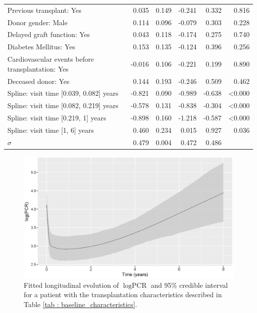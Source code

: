\begin{table}[!htb]
\begin{center}
\begin{tabular}{lrrrrr}
Previous transplant: Yes                                                                & 0.035  & 0.149    & -0.241 & 0.332  & 0.816          \\
Donor gender: Male                                                                      & 0.114  & 0.096    & -0.079 & 0.303  & 0.228          \\
Delayed graft function: Yes                                                                       & 0.043  & 0.118    & -0.174 & 0.275  & 0.740          \\
Diabetes Mellitus: Yes                                                                        & 0.153  & 0.135    & -0.124 & 0.396  & 0.256          \\
Cardiovascular events before transplantation: Yes                                                                     & -0.016 & 0.106    & -0.221 & 0.199  & 0.890          \\
Deceased donor: Yes                                                                  & 0.144  & 0.193    & -0.246 & 0.509  & 0.462          \\
Spline: visit time [0.039, 0.082] years & -0.821 & 0.090    & -0.989 & -0.638 & \textless0.000 \\
Spline: visit time [0.082, 0.219] years & -0.578 & 0.131    & -0.838 & -0.304 & \textless0.000 \\
Spline: visit time [0.219, 1] years & -0.898 & 0.160    & -1.218 & -0.587 & \textless0.000 \\
Spline: visit time [1, 6] years & 0.460  & 0.234    & 0.015  & 0.927  & 0.036          \\
$\sigma$                                                                            & 0.479  & 0.004    & 0.472  & 0.486  & \\
\hline
\end{tabular}
\end{center}
\end{table}

\begin{figure}[!htb]
\centerline{\includegraphics[width=\columnwidth]{images/pcr.eps}}
\caption{Fitted longitudinal evolution of $\log \text{PCR}$ and 95\% credible interval for a patient with the  transplantation characteristics described in Table \ref{tab : baseline_characteristics}.}
\label{fig : pcr_evolution}
\end{figure}

